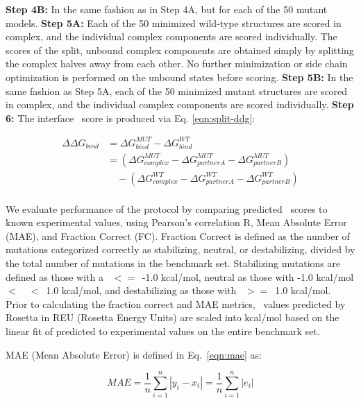 \textbf{Step 4B:} In the same fashion as in Step 4A, but for each of the 50 mutant models.
\textbf{Step 5A:} Each of the 50 minimized wild-type structures are scored in complex, and the individual complex components are scored individually. The scores of the split, unbound complex components are obtained simply by splitting the complex halves away from each other. No further minimization or side chain optimization is performed on the unbound states before scoring.
\textbf{Step 5B:} In the same fashion as Step 5A, each of the 50 minimized mutant structures are scored in complex, and the individual complex components are scored individually.
\textbf{Step 6:} The interface \ddg\ score is produced via Eq. \ref{eqn:split-ddg}:

\begin{equation}\label{eqn:split-ddg}
  \begin{split}
    {\Delta\Delta}G_{bind} & ={\Delta}G^{MUT}_{bind} - {\Delta}G^{WT}_{bind}\\
    & =({\Delta}G^{MUT}_{complex} - {\Delta}G^{MUT}_{partner A} - {\Delta}G^{MUT}_{partner B})\\
    & \quad - ({\Delta}G^{WT}_{complex} - {\Delta}G^{WT}_{partner A} - {\Delta}G^{WT}_{partner B})\\
  \end{split}
\end{equation}

We evaluate performance of the protocol by comparing predicted \ddg\ scores to known experimental values, using Pearson's correlation R, Mean Absolute Error (MAE), and Fraction Correct (FC). Fraction Correct is defined as the number of mutations categorized correctly as stabilizing, neutral, or destabilizing, divided by the total number of mutations in the benchmark set. Stabilizing mutations are defined as those with a \ddg\ $<=$\ -1.0 kcal/mol, neutral as those with -1.0 kcal/mol $<$\ \ddg\ $<$\ 1.0 kcal/mol, and destabilizing as those with \ddg\ $>=$\ 1.0 kcal/mol. Prior to calculating the fraction correct and MAE metrics, \ddg\ values predicted by Rosetta in REU (Rosetta Energy Units) are scaled into kcal/mol based on the linear fit of predicted to experimental values on the entire benchmark set.

MAE (Mean Absolute Error) is defined in Eq.~\ref{eqn:mae} as:

\begin{equation}\label{eqn:mae}
  MAE = \dfrac{1}{n}\sum\limits_{i=1}^n|y_i-x_i| = \dfrac{1}{n}\sum\limits_{i=1}^n|e_i|
\end{equation}

